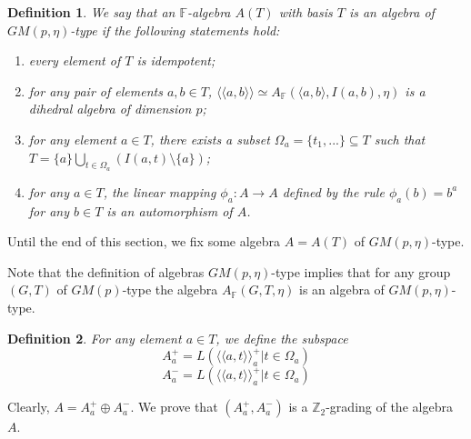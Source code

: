\documentclass[12pt]{article}
\newcommand\F{\mathbb{F}}
\newcommand\Z{\mathbb{Z}}
\newcommand\la{\langle}
\newcommand\ra{\rangle}
\newcommand\lla{\la\!\la}
\newcommand\rra{\ra\!\ra}
\newtheorem{defi}{Definition}
\begin{document}
\begin{defi}
We say that an $\F$-algebra $A(T)$ with basis $T$ is an algebra of $GM(p,\eta)$-type if the following statements hold:
\begin{enumerate}
	\item every element of $T$ is idempotent;
	\item for any pair of elements $a,b\in T$, $\lla a,b\rra\simeq A_{\F}(\la a, b\ra,I(a,b),\eta)$ is a dihedral algebra of dimension $p$;
	\item for any element $a\in T$, there exists a subset $\Omega_a=\{t_1,...\}\subseteq T$ such that $T=\{a\}\bigcup_{t\in\Omega_a}(I(a,t)\setminus\{a\})$;
	\item for any $a\in T$, the linear mapping $\phi_a:A\rightarrow A$ defined by the rule $\phi_a(b)=b^a$ for any $b\in T$ is an automorphism of $A$.
\end{enumerate} 
\end{defi}	


Until the end of this section, we fix some algebra $A=A(T)$ of $GM(p,\eta)$-type.

Note that the definition of algebras $GM(p,\eta)$-type implies that for any group $(G,T)$ of $GM(p)$-type the algebra $A_{\F}(G,T,\eta)$ is an algebra of $GM(p,\eta)$-type.

\begin{defi}
For any element $a\in T$, we define the subspace $$A_a^+=L(\lla a,t\rra_a^+| t\in \Omega_a)$$
$$A_a^-=L(\lla a,t\rra_a^+| t\in \Omega_a)$$
\end{defi}
Clearly, $A=A_a^+\oplus A_a^-$. We prove that $(A_a^+, A_a^-)$ is a $\Z_2$-grading of the algebra $A$.
\end{document}
